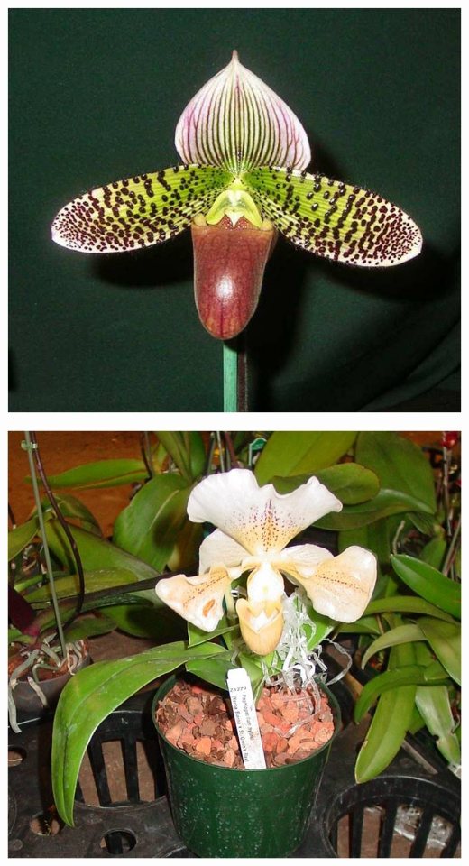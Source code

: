 \documentclass{article}
\begin{document}
\begin{center}
\includegraphics[height=0.925\paperheight]{../Orchid_Paphiopedilum_(Lady-Slipper).jpg}
\end{center}
\newpage

\begin{center}
\includegraphics[height=0.925\paperheight]{../Orchid_Paphiopedilum_(Lady-Slipper)2.jpg}
\end{center}
\newpage
\end{document}
